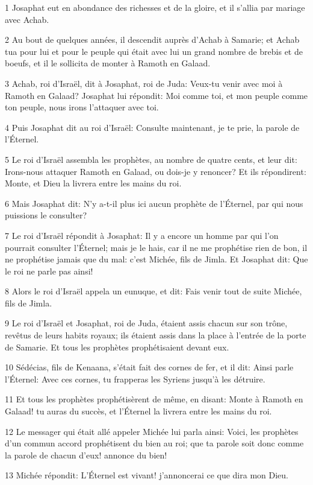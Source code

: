 \par 1 Josaphat eut en abondance des richesses et de la gloire, et il s'allia par mariage avec Achab.
\par 2 Au bout de quelques années, il descendit auprès d'Achab à Samarie; et Achab tua pour lui et pour le peuple qui était avec lui un grand nombre de brebis et de boeufs, et il le sollicita de monter à Ramoth en Galaad.
\par 3 Achab, roi d'Israël, dit à Josaphat, roi de Juda: Veux-tu venir avec moi à Ramoth en Galaad? Josaphat lui répondit: Moi comme toi, et mon peuple comme ton peuple, nous irons l'attaquer avec toi.
\par 4 Puis Josaphat dit au roi d'Israël: Consulte maintenant, je te prie, la parole de l'Éternel.
\par 5 Le roi d'Israël assembla les prophètes, au nombre de quatre cents, et leur dit: Irons-nous attaquer Ramoth en Galaad, ou dois-je y renoncer? Et ils répondirent: Monte, et Dieu la livrera entre les mains du roi.
\par 6 Mais Josaphat dit: N'y a-t-il plus ici aucun prophète de l'Éternel, par qui nous puissions le consulter?
\par 7 Le roi d'Israël répondit à Josaphat: Il y a encore un homme par qui l'on pourrait consulter l'Éternel; mais je le hais, car il ne me prophétise rien de bon, il ne prophétise jamais que du mal: c'est Michée, fils de Jimla. Et Josaphat dit: Que le roi ne parle pas ainsi!
\par 8 Alors le roi d'Israël appela un eunuque, et dit: Fais venir tout de suite Michée, fils de Jimla.
\par 9 Le roi d'Israël et Josaphat, roi de Juda, étaient assis chacun sur son trône, revêtus de leurs habits royaux; ils étaient assis dans la place à l'entrée de la porte de Samarie. Et tous les prophètes prophétisaient devant eux.
\par 10 Sédécias, fils de Kenaana, s'était fait des cornes de fer, et il dit: Ainsi parle l'Éternel: Avec ces cornes, tu frapperas les Syriens jusqu'à les détruire.
\par 11 Et tous les prophètes prophétisèrent de même, en disant: Monte à Ramoth en Galaad! tu auras du succès, et l'Éternel la livrera entre les mains du roi.
\par 12 Le messager qui était allé appeler Michée lui parla ainsi: Voici, les prophètes d'un commun accord prophétisent du bien au roi; que ta parole soit donc comme la parole de chacun d'eux! annonce du bien!
\par 13 Michée répondit: L'Éternel est vivant! j'annoncerai ce que dira mon Dieu.
